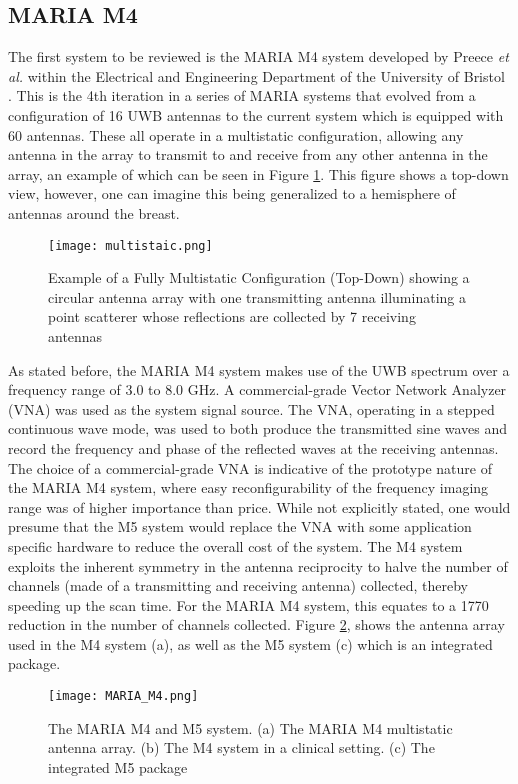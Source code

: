 \subsection{MARIA M4}
The first system to be reviewed is the MARIA M4 system developed by Preece \textit{et al.} within the Electrical and Engineering
Department of the University of Bristol \cite{preeceMARIAM4Clinical2016}. This is the 4th iteration in a series of MARIA
systems that evolved from a configuration of 16 UWB antennas to the current system which is equipped with 60 antennas.
These all operate in a multistatic configuration, allowing any antenna in the array to transmit to and receive from any
other antenna in the array, an example of which can be seen in Figure \ref{fig:MultistaticExample}. This figure shows a
top-down view, however, one can imagine this being generalized to a hemisphere of antennas around the breast. \hfill
\begin{figure}
    \texttt{[image: multistaic.png]}
    \centering
    \caption{Example of a Fully Multistatic Configuration (Top-Down) showing a circular antenna array with one transmitting antenna illuminating a point scatterer whose reflections are collected by 7 receiving antennas}
    \label{fig:MultistaticExample}
\end{figure}
As stated before, the MARIA M4 system makes use of the UWB spectrum over a frequency range of 3.0 to 8.0 GHz.
A commercial-grade Vector Network Analyzer (VNA) was used as the system signal source. The VNA, operating in a stepped
continuous wave mode, was used to both produce the transmitted sine waves and record the frequency and phase of the
reflected waves at the receiving antennas. The choice of a commercial-grade VNA is indicative of the prototype nature of
the MARIA M4 system, where easy reconfigurability of the frequency imaging range was of higher importance than price.
While not explicitly stated, one would presume that the M5 system would replace the VNA with some application specific
hardware to reduce the overall cost of the system. The M4 system exploits the inherent symmetry in the antenna
reciprocity to halve the number of channels (made of a transmitting and receiving antenna) collected, thereby speeding
up the scan time. For the MARIA M4 system, this equates to a 1770 reduction in the number of channels collected. Figure
\ref{fig:MARIAM4}, shows the antenna array used in the M4 system (a), as well as the M5 system (c) which is an
integrated package.
\begin{figure}
    \texttt{[image: MARIA\_M4.png]}
    \centering
    \caption{The MARIA M4 and M5 system. (a) The MARIA M4 multistatic antenna array. (b) The M4 system in a clinical setting. (c) The integrated M5 package \cite{preeceMARIAM4Clinical2016}}
    \label{fig:MARIAM4}
\end{figure}
